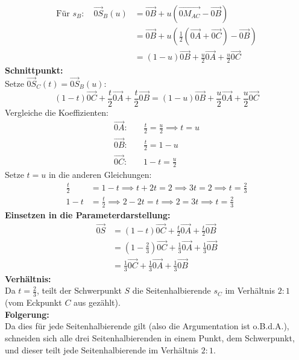 \documentclass[12pt,a4paper]{article}
\begin{document}
\begin{align*} 
    \text{Für } s_B: \quad \overrightarrow{0S}_B(u) &= \overrightarrow{0B} + u\left(\overrightarrow{0M_{AC}} - \overrightarrow{0B}\right) \\ 
                                                    &= \overrightarrow{0B} + u\left(\frac{1}{2}(\overrightarrow{0A} + \overrightarrow{0C}) - \overrightarrow{0B}\right) \\ 
                                                    &= (1-u)\overrightarrow{0B} + \frac{u}{2}\overrightarrow{0A} + \frac{u}{2}\overrightarrow{0C} 
\end{align*}
\newpage
\noindent \textbf{Schnittpunkt:}\\
Setze $\overrightarrow{0S}_C(t) = \overrightarrow{0S}_B(u)$: 
\[ 
    (1-t)\overrightarrow{0C} + \frac{t}{2}\overrightarrow{0A} + \frac{t}{2}\overrightarrow{0B} = (1-u)\overrightarrow{0B} + \frac{u}{2}\overrightarrow{0A} + \frac{u}{2}\overrightarrow{0C} 
\] 
Vergleiche die Koeffizienten: 
\begin{align*} 
    \overrightarrow{0A}: &\quad \frac{t}{2} = \frac{u}{2} \implies t = u \\ \overrightarrow{0B}: &\quad \frac{t}{2} = 1-u \\ 
    \overrightarrow{0C}: &\quad 1-t = \frac{u}{2} 
\end{align*} 
Setze $t = u$ in die anderen Gleichungen: 
\begin{align*} 
    \frac{t}{2} &= 1-t \implies t + 2t = 2 \implies 3t = 2 \implies t = \frac{2}{3} \\ 
    1-t &= \frac{t}{2} \implies 2-2t = t \implies 2 = 3t \implies t = \frac{2}{3} 
\end{align*} 
\textbf{Einsetzen in die Parameterdarstellung:} 
\begin{align*} 
    \overrightarrow{0S} &= (1-t)\overrightarrow{0C} + \frac{t}{2}\overrightarrow{0A} + \frac{t}{2}\overrightarrow{0B} \\ 
                        &= \left(1 - \frac{2}{3}\right)\overrightarrow{0C} + \frac{1}{3}\overrightarrow{0A} + \frac{1}{3}\overrightarrow{0B} \\ 
                        &= \frac{1}{3}\overrightarrow{0C} + \frac{1}{3}\overrightarrow{0A} + \frac{1}{3}\overrightarrow{0B} 
\end{align*} 
\textbf{Verhältnis:}\\ 
Da $t = \frac{2}{3}$, teilt der Schwerpunkt $S$ die Seitenhalbierende $s_C$ im Verhältnis $2:1$ (vom Eckpunkt $C$ aus gezählt). \\ 
\textbf{Folgerung:}\\ Da dies für jede Seitenhalbierende gilt (also die Argumentation ist o.B.d.A.), schneiden sich alle drei Seitenhalbierenden in einem Punkt, dem Schwerpunkt, und dieser teilt jede Seitenhalbierende im Verhältnis $2:1$.
\end{document}
